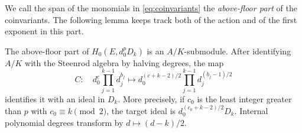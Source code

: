 We call the span of the monomials in \eqref{eq:coinvariants} the
\emph{above-floor part} of the coinvariants.  The following lemma keeps
track both of the action and of the first exponent in this part.

\begin{lemma}\label{lem:cartier}
The above-floor part of $H_0(E,d_0^pD_k)$ is an $A/K$-submodule.
After identifying $A/K$ with the Steenrod algebra by halving degrees,
the map
\begin{equation}\label{eq:cartier}
 C:\quad d_0^c\prod_{j=1}^{k-1}d_j^{b_j}
 \longmapsto
 d_0^{(c+k-2)/2}\prod_{j=1}^{k-1}d_j^{(b_j-1)/2}
\end{equation}
identifies it with an ideal in $D_k$.  More precisely, if
$c_0$ is the least integer greater than $p$ with $c_0\equiv k\pmod2$,
the target ideal is $d_0^{(c_0+k-2)/2}D_k$.
Internal polynomial degrees transform by $d\mapsto(d-k)/2$.
\end{lemma}

